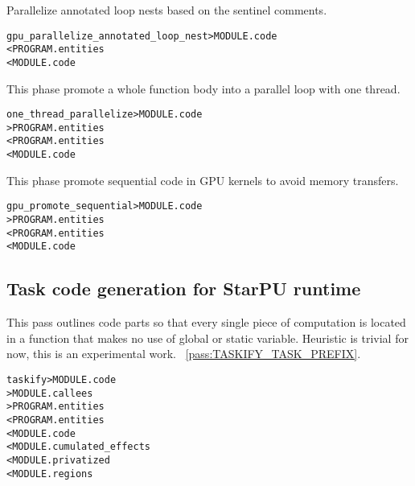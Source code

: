 \documentclass[a4paper]{report}
\newenvironment{PipsMake}{\begin{alltt}}{\end{alltt}}
\newcommand{\PipsPassRef}[1]{\texttt{\detokenize{#1}}~\ref{pass:#1}}
\newenvironment{PipsPass}[1]{\label{pass:#1}}{}
\begin{document}
\begin{PipsPass}{gpu_parallelize_annotated_loop_nest}
Parallelize annotated loop nests based on the sentinel comments.
\end{PipsPass}

\begin{PipsMake}
gpu_parallelize_annotated_loop_nest        > MODULE.code
        < PROGRAM.entities
        < MODULE.code

\end{PipsMake}


\begin{PipsPass}{one_thread_parallelize}
This phase promote a whole function body into a parallel loop with one thread.
\end{PipsPass}

\begin{PipsMake}
one_thread_parallelize	> MODULE.code
		> PROGRAM.entities
		< PROGRAM.entities
		< MODULE.code
\end{PipsMake}


\begin{PipsPass}{gpu_promote_sequential}
This phase promote sequential code in GPU kernels to avoid memory transfers.
\end{PipsPass}

\begin{PipsMake}
gpu_promote_sequential	> MODULE.code
		> PROGRAM.entities
		< PROGRAM.entities
		< MODULE.code
\end{PipsMake}


\subsection{Task code generation for StarPU runtime}
\label{subsection-stapu-taskify}

\begin{PipsPass}{taskify}
This pass outlines code parts so that every single piece of computation is 
located in a function that makes no use of global or static variable. 
Heuristic is trivial for now, this is an experimental work.
\PipsPassRef{TASKIFY_TASK_PREFIX}.
\end{PipsPass}
\begin{PipsMake}
taskify                        > MODULE.code
                               > MODULE.callees
                               > PROGRAM.entities
               < PROGRAM.entities
               < MODULE.code
               < MODULE.cumulated_effects
               < MODULE.privatized
               < MODULE.regions
\end{PipsMake}
\end{document}
